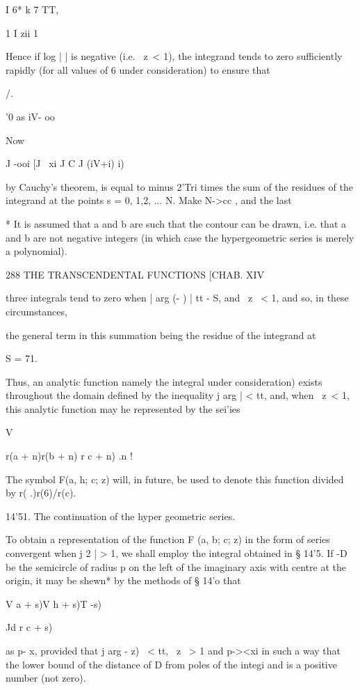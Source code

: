   I 6* k 7 TT,

1 I zii 1

Hence if log | | is negative (i.e. \ z\ < 1), the integrand tends to
zero sufficiently rapidly (for all values of 6 under consideration) to
ensure that

/.

'0 as iV- oo

Now

J -ooi [J ~xi J C J (iV+i) i)

by Cauchy's theorem, is equal to minus 2'Tri times the sum of the
residues of the integrand at the points s = 0, 1,2, ... N. Make N->cc
, and the last

* It is assumed that a and b are such that the contour can be drawn,
i.e. that a and b are not negative integers (in which case the
hypergeometric series is merely a polynomial).

288 THE TRANSCENDENTAL FUNCTIONS [CHAB. XIV

three integrals tend to zero when | arg (- ) | tt - S, and \ z \ < 1,
and so, in these circumstances,

the general term in this summation being the residue of the integrand
at

S = 71.

Thus, an analytic function namely the integral under consideration)
exists throughout the domain defined by the inequality j arg | < tt,
and, when \ z\ < 1, this analytic function may he represented by the
sei'ies

V

r(a + n)r(b + n) r c + n) .n !

The symbol F(a, h; c; z) will, in future, be used to denote this
function divided by r( .)r(6)/r(c).

14'51. The continuation of the hyper geometric series.

To obtain a representation of the function F (a, b; c; z) in the form
of series convergent when j 2 | > 1, we shall employ the integral
obtained in § 14'5. If -D be the semicircle of radius p on the left of
the imaginary axis with centre at the origin, it may be shewn* by the
methods of § 14'o that

V a + s)V h + s)T -s)

Jd r c + s)

as p- x, provided that j arg - z) \ < tt, \ z \ > 1 and p-><xi in
such a way that the lower bound of the distance of D from poles of the
integi and is a positive number (not zero).

